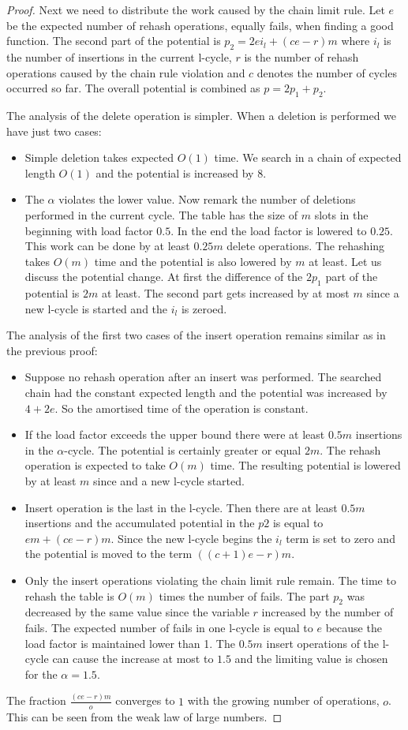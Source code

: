 \begin{proof}
Next we need to distribute the work caused by the chain limit rule. Let $e$ be the expected number of rehash operations, equally fails, when finding a good function. The second part of the potential is $p_2 = 2ei_{l} + (ce - r) m$ where $i_l$ is the number of insertions in the current l-cycle, $r$ is the number of rehash operations caused by the chain rule violation and $c$ denotes the number of cycles occurred so far. The overall potential is combined as $p = 2p_1 + p_2$.

The analysis of the delete operation is simpler. When a deletion is performed we have just two cases:
\begin{itemize}
\item Simple deletion takes expected $O(1)$ time. We search in a chain of expected length $O(1)$ and the potential is increased by $8$.
\item The $\alpha$ violates the lower value. Now remark the number of deletions performed in the current cycle. The table has the size of $m$ slots in the beginning with load factor $0.5$. In the end the load factor is lowered to $0.25$. This work can be done by at least $0.25 m$ delete operations. The rehashing takes $O(m)$ time and the potential is also lowered by $m$ at least. Let us discuss the potential change. At first the difference of the $2p_1$ part of the potential is $2m$ at least. The second part gets increased by at most $m$ since a new l-cycle is started and the $i_l$ is zeroed.
\end{itemize}

The analysis of the first two cases of the insert operation remains similar as in the previous proof:
\begin{itemize}
\item Suppose no rehash operation after an insert was performed. The searched chain had the constant expected length and the potential was increased by $4 + 2e$. So the amortised time of the operation is constant.
\item If the load factor exceeds the upper bound there were at least $0.5 m$ insertions in the $\alpha$-cycle. The potential is certainly greater or equal $2m$. The rehash operation is expected to take $O(m)$ time. The resulting potential is lowered by at least $m$ since and a new l-cycle started.
\item Insert operation is the last in the l-cycle. Then there are at least $0.5 m$ insertions and the accumulated potential in the $p2$ is equal to $em + (ce - r)m$. Since the new l-cycle begins the $i_l$ term is set to zero and the potential is moved to the term $((c + 1)e -r)m$.
\item Only the insert operations violating the chain limit rule remain. The time to rehash the table is $O(m)$ times the number of fails. The part $p_2$ was decreased by the same value since the variable $r$ increased by the number of fails. The expected number of fails in one l-cycle is equal to $e$ because the load factor is maintained lower than 1. The $0.5 m$ insert operations of the l-cycle can cause the increase at most to $1.5$ and the limiting value is chosen for the $\alpha = 1.5$.
\end{itemize}

The fraction $\frac{(ce - r)m}{o}$ converges to $1$ with the growing number of operations, $o$. This can be seen from the weak law of large numbers.
\end{proof}

